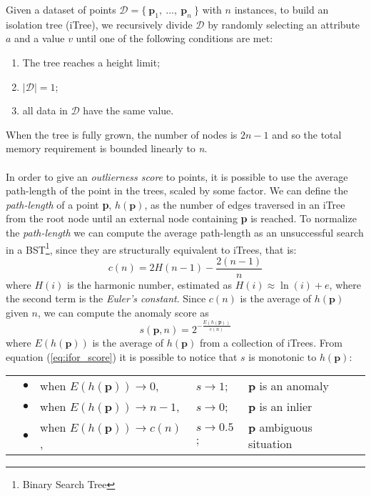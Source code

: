 Given a dataset of points $\mathcal{D} = \{\ \textbf{p}_1,\ ...,\ \textbf{p}_n\ \}$ with $n$ instances, to build an isolation tree (iTree), we recursively divide $\mathcal{D}$ by randomly selecting an attribute $a$ and a value $v$ until one of the following conditions are met:
\begin{enumerate}[label=(\roman*)]
    \item The tree reaches a height limit;
    \item $|\mathcal{D}| = 1$;
    \item all data in $\mathcal{D}$ have the same value.
\end{enumerate}
When the tree is fully grown, the number of nodes is $2n - 1$ and so the total memory requirement is bounded linearly to \textit{n}.

\paragraph{}
In order to give an \textit{outlierness score} to points, it is possible to use the average path-length of the point in the trees, scaled by some factor. We can define the \textit{path-length} of a point \textbf{p}, $h(\textbf{p})$, as the number of edges traversed in an iTree from the root node until an external node containing \textbf{p} is reached. To normalize the \textit{path-length} we can compute the average path-length as an unsuccessful search in a BST\footnote{Binary Search Tree}, since they are structurally equivalent to iTrees, that is:
\begin{equation}
\label{eq:ifor_score_ad}
    c(n) = 2H(n-1) - \frac{2(n - 1)}{n}
\end{equation}
where $H(i)$ is the harmonic number, estimated as $H(i) \approx \ln{(i)} + e$, where the second term is the \textit{Euler's constant}. \newline
Since $c(n)$ is the average of $h(\textbf{p})$ given $n$, we can compute the anomaly score as
\begin{equation}
    \label{eq:ifor_score}
    s(\textbf{p}, n) = 2^{\displaystyle - \frac{E(h(\textbf{p}))}{c(n)}}
\end{equation}
where $E(h(\textbf{p}))$ is the average of $h(\textbf{p})$ from a collection of iTrees. From equation (\ref{eq:ifor_score}) it is possible to notice that $s$ is monotonic to $h(\textbf{p})$:
\begin{table}[h!]
    \begin{tabular}{l l l l l}
        \quad & $\bullet$ & when $E(h(\textbf{p})) \to 0$, & $s \to 1$; & \textbf{p} is an anomaly \\
        \quad & $\bullet$ & when $E(h(\textbf{p})) \to n-1$, & $s \to 0$; & \textbf{p} is an inlier \\
        \quad & $\bullet$ & when $E(h(\textbf{p})) \to c(n)$, & $s \to 0.5$; & \textbf{p} ambiguous situation
    \end{tabular}
\end{table}


